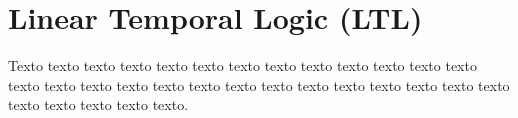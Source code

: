 \chapter{Linear Temporal Logic (LTL)}
\label{ape-ltl}

Texto texto texto texto texto texto texto texto texto texto texto texto texto
texto texto texto texto texto texto texto texto texto texto texto texto texto
texto texto texto texto texto texto.

